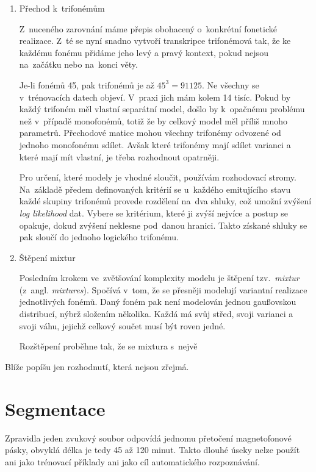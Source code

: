 \begin{enumerate}
\item{Přechod k~trifonémům}

Z~nuceného zarovnání máme přepis obohacený o~konkrétní fonetické realizace. Z~té
se nyní snadno vytvoří transkripce trifonémová tak, že ke každému fonému přidáme
jeho levý a pravý kontext, pokud nejsou na~začátku nebo na~konci věty.

Je-li fonémů 45, pak trifonémů je až $45^3 = 91125$. Ne všechny se v~trénovacích
datech objeví. V~praxi jich mám kolem 14 tisíc. Pokud by každý trifoném měl
vlastní separátní model, došlo by k~opačnému problému než v~případě monofonémů,
totiž že by celkový model měl příliš mnoho parametrů. Přechodové matice mohou
všechny trifonémy odvozené od jednoho monofonému sdílet. Avšak které trifonémy
mají sdílet varianci a které mají mít vlastní, je třeba rozhodnout opatrněji.

Pro určení, které modely je vhodné sloučit, používám rozhodovací stromy.
Na~základě předem definovaných kritérií se u~každého emitujícího stavu každé
skupiny trifonémů provede rozdělení na~dva shluky, což umožní zvýšení
\textit{log likelihood} dat. Vybere se kritérium, které ji zvýší nejvíce a
postup se opakuje, dokud zvýšení neklesne pod~danou hranici. Takto získané
shluky se pak sloučí do jednoho logického trifonému.

\item{Štěpení mixtur}

Posledním krokem ve~zvětšování komplexity modelu je štěpení tzv.~\textit{mixtur}
(z~angl. \textit{mixtures}). Spočívá v~tom, že se přesněji modelují variantní
realizace jednotlivých fonémů. Daný foném pak není modelován jednou gaußovskou
distribucí, nýbrž složením několika. Každá má svůj střed, svoji varianci a svoji
váhu, jejichž celkový součet musí být roven jedné.

Rozštěpení proběhne tak, že se mixtura s~nejvě

\end{enumerate}

Blíže popíšu jen rozhodnutí, která nejsou zřejmá.

\section{Segmentace}

Zpravidla jeden zvukový soubor odpovídá jednomu přetočení magnetofonové pásky,
obvyklá délka je tedy 45 až 120 minut. Takto dlouhé úseky nelze použít ani jako
trénovací příklady ani jako cíl automatického rozpoznávání.

